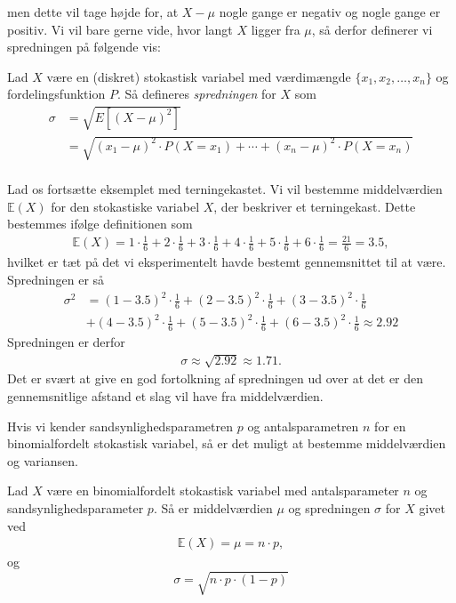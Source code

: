 men dette vil tage højde for, at $X-\mu$ nogle gange er negativ og nogle gange er positiv. Vi vil bare gerne vide, hvor langt $X$ ligger fra $\mu$, så derfor definerer vi spredningen på følgende vis:
\begin{defn}[Spredning]
Lad $X$ være en (diskret) stokastisk variabel med værdimængde $\{x_1,x_2,\hdots,x_n\}$ og fordelingsfunktion $P$. Så defineres \textit{spredningen} for $X$ som
\begin{align*}
\sigma &= \sqrt{E[(X-\mu)^2]}\\
&= \sqrt{(x_1-\mu)^2\cdot P(X=x_1) + \cdots + (x_n-\mu)^2 \cdot P(X=x_n)}\\
\end{align*}
 
\end{defn}

\begin{exa}
Lad os fortsætte eksemplet med terningekastet. Vi vil bestemme middelværdien $\mathbb{E}(X)$ for den stokastiske variabel $X$, der beskriver et terningekast. Dette bestemmes ifølge definitionen som
\begin{align*}
\mathbb{E}(X) = 1\cdot \frac{1}{6} + 2\cdot \frac{1}{6}+3\cdot \frac{1}{6}+4\cdot \frac{1}{6}+5\cdot \frac{1}{6}+6\cdot \frac{1}{6} = \frac{21}{6} = 3.5,
\end{align*}
hvilket er tæt på det vi eksperimentelt havde bestemt gennemsnittet til at være. 
Spredningen er så
\begin{align*}
\sigma^2 &= (1-3.5)^2 \cdot \frac{1}{6} + (2-3.5)^2 \cdot \frac{1}{6} + (3-3.5)^2 \cdot \frac{1}{6}\\
 &+ (4-3.5)^2 \cdot \frac{1}{6} + (5-3.5)^2 \cdot \frac{1}{6} +(6-3.5)^2 \cdot \frac{1}{6} \approx 2.92
\end{align*}
Spredningen er derfor 
\begin{align*}
\sigma \approx \sqrt{2.92} \approx 1.71.
\end{align*}
Det er svært at give en god fortolkning af spredningen ud over at det er den gennemsnitlige afstand et slag vil have fra middelværdien. 
\end{exa}

Hvis vi kender sandsynlighedsparametren $p$ og antalsparametren $n$ for en binomialfordelt stokastisk variabel, så er det muligt at bestemme middelværdien og variansen.
\begin{setn}
Lad $X$ være en binomialfordelt stokastisk variabel med antalsparameter $n$ og sandsynlighedsparameter $p$. Så er middelværdien $\mu$ og spredningen $\sigma$ for $X$ givet ved
\begin{align*}
\mathbb{E}(X) = \mu = n\cdot p,
\end{align*} 
og 
\[
 \sigma = \sqrt{n\cdot p\cdot (1-p)}
\]
\end{setn}



